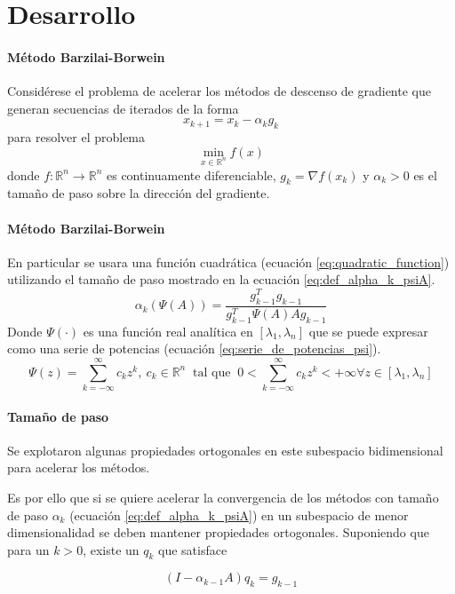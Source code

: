 \section{Desarrollo}

\begin{frame}{\insertsectionhead}
    \framesubtitle{Método Barzilai-Borwein}
    Considérese el problema de acelerar los métodos de descenso de gradiente que generan secuencias de iterados de la forma
    \begin{equation*}
        x_{k+1} = x_k - \alpha_k g_k
    \end{equation*}
    para resolver el problema
    \begin{equation*}
        \min_{x\in\mathbb{R}^n}f(x)
    \end{equation*}
    donde $f:\mathbb{R}^n \rightarrow \mathbb{R}^n$ es continuamente diferenciable, $g_k=\nabla f(x_k)$ y $\alpha_k>0$ es el tamaño de paso sobre la dirección del gradiente.
\end{frame}

\begin{frame}{\insertsectionhead}
    \framesubtitle{Método Barzilai-Borwein}
    En particular se usara una función cuadrática (ecuación \ref{eq:quadratic_function}) utilizando el tamaño de paso mostrado en la ecuación \ref{eq:def_alpha_k_psiA}.
    \begin{equation}
        \alpha_k(\Psi(A)) = \frac{g_{k-1}^Tg_{k-1}}{g^T_{k-1}\Psi(A)Ag_{k-1}} \label{eq:def_alpha_k_psiA}
    \end{equation}
    Donde $\Psi(\cdot)$ es una función real analítica en $[\lambda_1, \lambda_n]$ que se puede expresar como una serie de potencias (ecuación \ref{eq:serie_de_potencias_psi}).
    \begin{equation}
        \Psi(z) = \sum\limits_{k=-\infty}^{\infty} c_kz^k,\ c_k\in \mathbb{R}^n  \;\; \text{tal que} \;\; 0<\sum_{k =- \infty}^{\infty}c_k z^k<+\infty \forall z\in[\lambda_1,  \lambda_n]  \label{eq:serie_de_potencias_psi}
    \end{equation}
\end{frame}

\begin{frame}{\insertsectionhead}
    \framesubtitle{Tamaño de paso}
    Se explotaron algunas propiedades ortogonales en este subespacio bidimensional para acelerar los métodos.

    Es por ello que si se quiere acelerar la convergencia de los métodos con tamaño de paso $\alpha_k$ (ecuación \ref{eq:def_alpha_k_psiA}) en un subespacio de menor dimensionalidad se deben mantener propiedades ortogonales. Suponiendo que para un $k>0$, existe un $q_k$ que satisface

    \begin{equation*}
        (I-\alpha_{k-1}A)q_k = g_{k-1}
        \label{eq:qdef}
    \end{equation*}
\end{frame}

